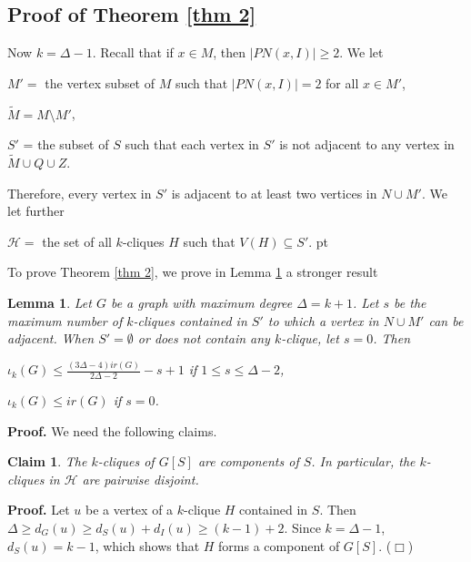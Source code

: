 \documentclass[11pt]{article}
\newtheorem{lem}{Lemma}
\newtheorem{claim}{Claim}
\newcommand{\smallqed}{{\tiny ($\Box$)}}
\newcommand{\proof}{\noindent\textbf{Proof. }}
\newcommand{\2}{ \vspace{0.2cm} }
\newcommand{\1}{ \vspace{0.1cm} }
\begin{document}
\subsection{Proof of Theorem \ref{thm 2}}
\indent Now $k=\Delta -1$. Recall that if $x\in M$, then $|PN(x,I)|\ge 2$. We let

\indent $M' =$ the vertex subset of $M$ such that $|PN(x, I)| = 2$ for all $x \in M'$,

\indent $\tilde{M} = M \setminus M'$,

\indent $S'$ = the subset of $S$ such that each vertex in $S'$ is not adjacent to any vertex in $\tilde{M} \cup Q \cup Z$.

\noindent Therefore, every vertex in $S'$ is adjacent to at least two vertices in $N \cup M'$. We let further

\indent $\mathcal{H} =$ the set of all $k$-cliques $H$ such that $V(H) \subseteq S'$.
 pt


\noindent To prove Theorem \ref{thm 2}, we prove in Lemma \ref{l2}
a stronger result

\noindent
\begin{lem}\label{l2}
\emph{Let $G$ be a graph with maximum degree $\Delta = k + 1$. Let  $s$ be the maximum number of $k$-cliques contained in $S'$ to which a vertex in $N \cup M'$ can be adjacent.
When $S'=\emptyset$ or does not contain any $k$-clique, let $s=0$.  Then}

$\iota_{k}(G) \leq \frac{(3\Delta - 4)ir(G)}{2\Delta - 2} - s + 1$
if $1 \leq s \leq \Delta - 2$,


$\iota _k(G)\leq ir(G)$ if $s=0$.

\end{lem}

\proof
\noindent We need the following claims.


\begin{claim}
\label{c21}
The $k$-cliques of $G[S]$ are components of $S$. In particular, the $k$-cliques in $\mathcal{H}$ are pairwise disjoint.
\end{claim}
\proof
Let $u$ be a vertex of a $k$-clique $H$ contained in $S$. Then $\Delta \ge d_G(u) \ge d_S(u)+d_I(u)\ge (k-1)+2$. Since $k=\Delta -1$,  $d_S(u)=k-1$, which shows that $H$ forms a component of $G[S]$.
\smallqed
\end{document}
